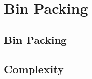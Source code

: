 \documentclass[../maths.tex]{subfiles}
\begin{document}
\chapter{Bin Packing}
\section{Bin Packing}
\section{Complexity}
\end{document}
